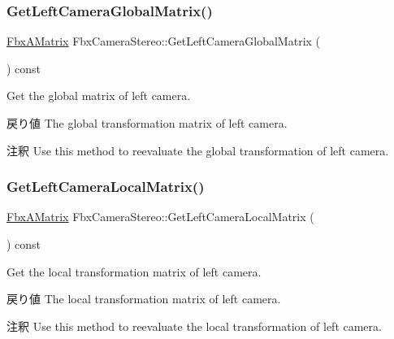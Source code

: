 \subsubsection{\texorpdfstring{Get\+Left\+Camera\+Global\+Matrix()}{GetLeftCameraGlobalMatrix()}}
{\footnotesize\ttfamily \hyperlink{class_fbx_a_matrix}{Fbx\+A\+Matrix} Fbx\+Camera\+Stereo\+::\+Get\+Left\+Camera\+Global\+Matrix (\begin{DoxyParamCaption}{ }\end{DoxyParamCaption}) const}

Get the global matrix of left camera. \begin{DoxyReturn}{戻り値}
The global transformation matrix of left camera. 
\end{DoxyReturn}
\begin{DoxyRemark}{注釈}
Use this method to reevaluate the global transformation of left camera. 
\end{DoxyRemark}
\mbox{\label{class_fbx_camera_stereo_aba407c7661b66bc57690534a7aaf445e}} 
\subsubsection{\texorpdfstring{Get\+Left\+Camera\+Local\+Matrix()}{GetLeftCameraLocalMatrix()}}
{\footnotesize\ttfamily \hyperlink{class_fbx_a_matrix}{Fbx\+A\+Matrix} Fbx\+Camera\+Stereo\+::\+Get\+Left\+Camera\+Local\+Matrix (\begin{DoxyParamCaption}{ }\end{DoxyParamCaption}) const}

Get the local transformation matrix of left camera. \begin{DoxyReturn}{戻り値}
The local transformation matrix of left camera. 
\end{DoxyReturn}
\begin{DoxyRemark}{注釈}
Use this method to reevaluate the local transformation of left camera. 
\end{DoxyRemark}
\mbox{\label{class_fbx_camera_stereo_a8c293c596ad0c3b9fb169bdf5b508a68}} 
